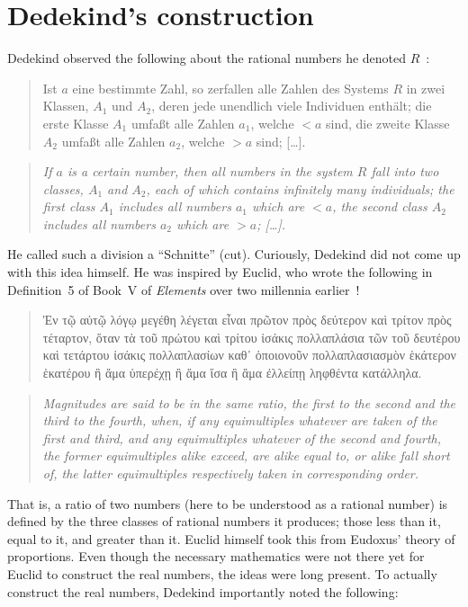 \documentclass[../main.tex]{subfiles}
\begin{document}
\section{Dedekind's construction}\label{sec:the_real_numbers:dedekinds_construction}
Dedekind observed the following about the rational numbers he denoted $R$~\cite{Dedekind1872}:
\begin{quote}
    \textgerman{Ist $a$ eine bestimmte Zahl, so zerfallen alle Zahlen des Systems $R$ in zwei Klassen, $A_1$ und $A_2$, deren jede unendlich viele Individuen enthält; die erste Klasse $A_1$ umfaßt alle Zahlen $a_1$, welche $<a$ sind, die zweite Klasse $A_2$ umfaßt alle Zahlen $a_2$, welche $>a$ sind; [\dots].}
\end{quote}
\begin{quote}
    \textit{If $a$ is a certain number, then all numbers in the system $R$ fall into two classes, $A_1$ and $A_2$, each of which contains infinitely many individuals; the first class $A_1$ includes all numbers $a_1$ which are $<a$, the second class $A_2$ includes all numbers $a_2$ which are $>a$; [\ldots].}
\end{quote}
He called such a division a ``\textgerman{Schnitte}'' (cut). Curiously, Dedekind did not come up with this idea himself. He was inspired by Euclid, who wrote the following in Definition~5 of Book~V of \textit{Elements} over two millennia earlier~\cite{Heath1926}!
\begin{quote}
    \textgreek{Ἐν τῷ αὐτῷ λόγῳ μεγέθη λέγεται εἶναι πρῶτον πρὸς δεύτερον καὶ τρίτον πρὸς τέταρτον, ὅταν τὰ τοῦ πρώτου καὶ τρίτου ἰσάκις πολλαπλάσια τῶν τοῦ δευτέρου καὶ τετάρτου ἰσάκις πολλαπλασίων καθ᾽ ὁποιονοῦν πολλαπλασιασμὸν ἑκάτερον ἑκατέρου ἢ ἅμα ὑπερέχῃ ἢ ἅμα ἴσα ἢ ἅμα ἐλλείπῃ ληφθέντα κατάλληλα.}
\end{quote}
\begin{quote}
    \textit{Magnitudes are said to be in the same ratio, the first to the second and the third to the fourth, when, if any equimultiples whatever are taken of the first and third, and any equimultiples whatever of the second and fourth, the former equimultiples alike exceed, are alike equal to, or alike fall short of, the latter equimultiples respectively taken in corresponding order.}
\end{quote}
That is, a ratio of two numbers (here to be understood as a rational number) is defined by the three classes of rational numbers it produces; those less than it, equal to it, and greater than it. Euclid himself took this from Eudoxus' theory of proportions. Even though the necessary mathematics were not there yet for Euclid to construct the real numbers, the ideas were long present. To actually construct the real numbers, Dedekind importantly noted the following:
\end{document}
